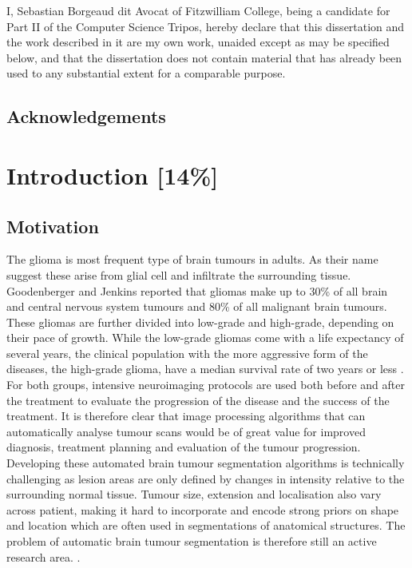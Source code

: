 \documentclass[12pt,a4paper,twoside,openright]{report}
\begin{document}
I, Sebastian Borgeaud dit Avocat of Fitzwilliam College, being a candidate for Part II of the Computer Science Tripos, hereby declare
that this dissertation and the work described in it are my own work,
unaided except as may be specified below, and that the dissertation
does not contain material that has already been used to any substantial
extent for a comparable purpose.

\bigskip
{}

\medskip
{}

\tableofcontents

\listoffigures

\newpage

\setlength{\parskip}{1em} %

\section*{Acknowledgements}



\pagestyle{headings}

\chapter{Introduction [14\%]}
\section{Motivation}
The glioma is most frequent type of brain tumours in adults. As their name suggest these arise from glial cell and infiltrate the surrounding tissue. Goodenberger and Jenkins \cite{gliomas_research} reported that gliomas make up to 30\% of all brain and central nervous system tumours and 80\% of all malignant brain tumours. These gliomas are further divided into low-grade and high-grade, depending on their pace of growth. While the low-grade gliomas come with a life expectancy of several years, the clinical population with the more aggressive form of the diseases, the high-grade glioma, have a median survival rate of two years or less \cite{gliomas_life_expectancy}. For both groups, intensive neuroimaging protocols are used both before and after the treatment to evaluate the progression of the disease and the success of the treatment. It is therefore clear that image processing algorithms that can automatically analyse tumour scans would be of great value for improved diagnosis, treatment planning and evaluation of the tumour progression. Developing these automated brain tumour segmentation algorithms is technically challenging as lesion areas are only defined by changes in intensity relative to the surrounding normal tissue. Tumour size, extension and localisation also vary across patient, making it hard to incorporate and encode strong priors on shape and location which are often used in segmentations of anatomical structures. The problem of automatic brain tumour segmentation is therefore still an active research area. \cite{brats-proceedings}.
\end{document}
